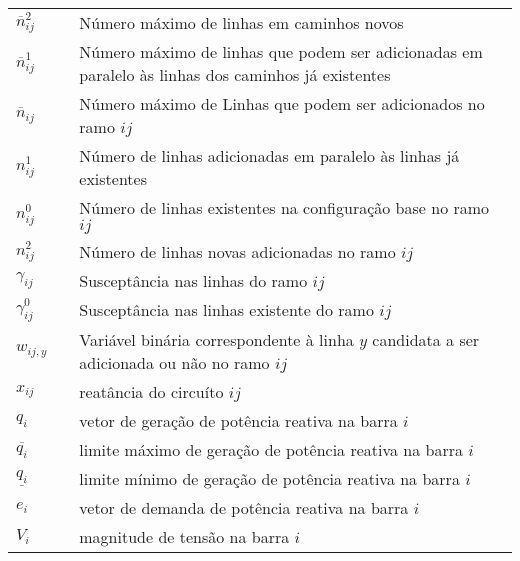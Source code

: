 \newpage
\noindent
\begin{tabular}{l c p{.85\linewidth}}

$\overline{n}_{ij}^2$  & & Número máximo de linhas em caminhos novos \\

$\overline{n}_{ij}^1$  & & Número máximo de linhas que podem ser adicionadas em paralelo às linhas dos caminhos já existentes\\

$\overline{n}_{ij}$    & & Número máximo de Linhas que podem ser adicionados no ramo $ij$\\

$n_{ij}^1$             & & Número de linhas adicionadas em paralelo às linhas já existentes\\

$n_{ij}^{0}$           & & Número de linhas existentes na configuração base no ramo $ij$\\

$n_{ij}^2$             & & Número de linhas novas adicionadas no ramo $ij$\\

$\gamma_{ij}$          & & Susceptância nas linhas do ramo $ij$\\

$\gamma_{ij}^0$        & & Susceptância nas linhas existente do ramo $ij$\\

$w_{ij,y}$             & & Variável binária correspondente à linha $y$ candidata a ser adicionada ou não no ramo $ij$\\

$x_{ij}$               & & reatância do circuíto $ij$\\

$q_{i}$                & & vetor de geração de potência reativa na barra $i$\\

$\overline{q_i}$       & & limite máximo de geração de potência reativa na barra $i$\\

$\underline{q_i}$      & & limite mínimo de geração de potência reativa na barra $i$\\

$e_{i}$                & & vetor de demanda de potência reativa na barra $i$\\

$V_{i}$                & & magnitude de tensão na barra $i$\\


\end{tabular}
